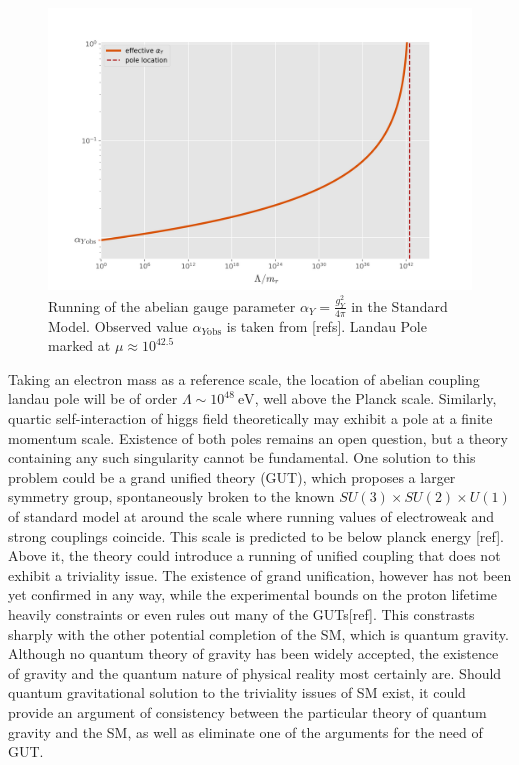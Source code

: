 \documentclass[11pt, a4paper]{article}
\begin{document}
\begin{figure}[H]
    \includegraphics[width=1\textwidth]{./figures/plotr.jpg}
    \caption{Running of the abelian gauge parameter $\alpha_Y = \frac{g_Y^2}{4\pi}$ in the Standard Model. Observed value $\alpha_{Y\text{obs}}$ is taken from [refs]. 
    Landau Pole marked at $\mu \approx 10^{42.5}$}
    \label{boxes}
\end{figure} 
Taking an electron mass as a reference scale, the location of abelian coupling landau pole will be of order $\Lambda \sim 10^{48} \ \text{eV}$, well above the Planck scale.
Similarly, quartic self-interaction of higgs field theoretically may exhibit a pole at a finite momentum scale.
Existence of both poles remains an open question, but a theory containing any such singularity cannot be fundamental.
One solution to this problem could be a grand unified theory (GUT), which proposes a larger symmetry group, spontaneously broken
to the known $SU(3)\times SU(2) \times U(1)$ of standard model at around the scale where running values of electroweak and strong couplings
coincide. This scale is predicted to be below planck energy [ref]. Above it, the theory could introduce
a running of unified coupling that does not exhibit a triviality issue.
The existence of grand unification, however has not been yet confirmed in any way, while the experimental bounds on the proton lifetime
heavily constraints or even rules out many of the GUTs[ref]. This constrasts sharply with the other potential completion of the SM,
which is quantum gravity. Although no quantum theory of gravity has been widely accepted, the existence of gravity and
the quantum nature of physical reality most certainly are. Should quantum gravitational solution to the triviality issues of SM exist,
it could provide an argument of consistency between the particular theory of quantum gravity and the SM, as well as eliminate one of the arguments for the need of GUT.
\end{document}
